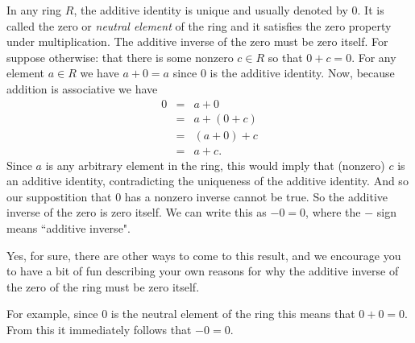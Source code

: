 \documentclass[12pt]{article}
\begin{document}
In any ring $R$, the additive identity is unique and usually denoted by $0$.  It is called the zero or {\em neutral element} of the ring and it satisfies the zero property under multiplication.  The additive inverse of the zero must be zero itself.  For suppose otherwise: that there is some nonzero $c \in R$ so that $0 + c = 0$.  For any element $a \in R$ we have $a + 0 = a$ since $0$ is the additive identity.  Now, because addition is associative we have
\begin{eqnarray*}
0 & = & a + 0 \\ 
 & = & a + (0 + c) \\
 & = & (a + 0) + c \\
 & = & a + c.
\end{eqnarray*}
Since $a$ is any arbitrary element in the ring, this would imply that (nonzero) $c$ is an additive identity, contradicting the uniqueness of the additive identity.  And so our suppostition that $0$ has a nonzero inverse cannot be true.  So the additive inverse of the zero is zero itself.  We can write this as $-0 = 0$, where the $-$ sign means ``additive inverse".

Yes, for sure, there are other ways to come to this result, and we encourage you to have a bit of fun describing your own reasons for why the additive inverse of the zero of the ring must be zero itself.

For example, since $0$ is the neutral element of the ring this means that $0 + 0 = 0$.  From this it immediately follows that $-0 = 0$.
\end{document}
